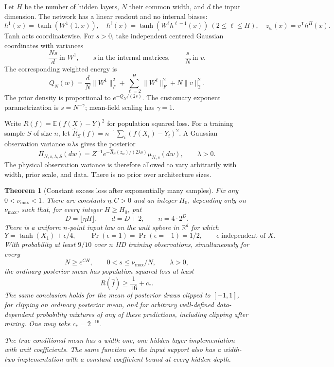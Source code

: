 \documentclass[11pt]{article}
\newtheorem{theorem}{Theorem}[section]
\begin{document}
Let $H$ be the number of hidden layers, $N$ their common width, and $d$ the input dimension. The network has a linear readout and no internal biases:
\[
 h^1(x)=\tanh(W^1(1,x)),\quad
 h^\ell(x)=\tanh(W^\ell h^{\ell-1}(x))\ (2\le\ell\le H),\quad
 z_w(x)=v^{\mathsf T}h^H(x).
\]
Tanh acts coordinatewise. For $s>0$, take independent centered Gaussian coordinates with variances
\begin{equation}
 \frac{Ns}{d}\ \text{in }W^1,\qquad
 s\ \text{in the internal matrices},\qquad
 \frac{s}{N}\ \text{in }v.
 \label{eq:prior}
\end{equation}
The corresponding weighted energy is
\begin{equation}
 Q_N(w)=\frac dN\|W^1\|_F^2+
             \sum_{\ell=2}^H\|W^\ell\|_F^2+N\|v\|_2^2.
 \label{eq:energy}
\end{equation}
The prior density is proportional to $e^{-Q_N/(2s)}$. The customary exponent parametrization is $s=N^{-\gamma}$; mean-field scaling has $\gamma=1$.

Write $R(f)=\mathbb E(f(X)-Y)^2$ for population squared loss. For a training sample $S$ of size $n$, let $\widehat R_S(f)=n^{-1}\sum_i(f(X_i)-Y_i)^2$. A Gaussian observation variance $n\lambda s$ gives the posterior
\begin{equation}
 \Pi_{N,s,\lambda,S}(dw)=Z^{-1}
       e^{-\widehat R_S(z_w)/(2\lambda s)}\mu_{N,s}(dw),\qquad \lambda>0.
 \label{eq:posterior}
\end{equation}
The physical observation variance is therefore allowed to vary arbitrarily with width, prior scale, and data. There is no prior over architecture sizes.

\begin{theorem}[Constant excess loss after exponentially many samples]
\label{thm:main}
Fix any $0<\nu_{\max}<1$. There are constants $\eta,C>0$ and an integer $H_0$, depending only on $\nu_{\max}$, such that, for every integer $H\ge H_0$, put
\[
 D=\lfloor\eta H\rfloor,\qquad d=D+2,\qquad n=4\cdot2^D.
\]
There is a uniform $n$-point input law on the unit sphere in $\mathbb R^d$ for which
\[
 Y=\tanh(X_1)+\epsilon/4,
 \qquad \Pr(\epsilon=1)=\Pr(\epsilon=-1)=1/2,
 \qquad \epsilon\text{ independent of }X.
\]
With probability at least $9/10$ over $n$ IID training observations, simultaneously for every
\[
 N\ge e^{CH},\qquad 0<s\le\nu_{\max}/N,\qquad \lambda>0,
\]
the ordinary posterior mean has population squared loss at least
\[
 R(\widehat f)\ge \frac1{16}+c_*.
\]
The same conclusion holds for the mean of posterior draws clipped to $[-1,1]$, for clipping an ordinary posterior mean, and for arbitrary well-defined data-dependent probability mixtures of any of these predictions, including clipping after mixing. One may take $c_*=2^{-16}$.

The true conditional mean has a width-one, one-hidden-layer implementation with unit coefficients. The same function on the input support also has a width-two implementation with a constant coefficient bound at every hidden depth.
\end{theorem}
\end{document}
